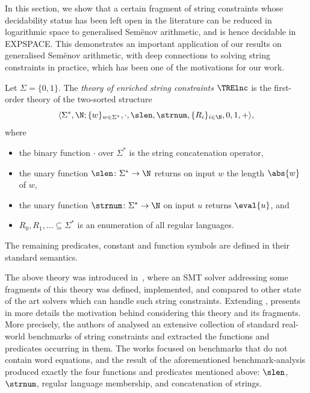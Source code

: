 
In this section, we show that a certain fragment of string constraints
whose decidability status has been left open in the literature can be
reduced in logarithmic space to generalised Sem{\"e}nov arithmetic,
and is hence decidable in EXPSPACE. This demonstrates an important
application of our results on generalised Sem{\"e}nov arithmetic, with
deep connections to solving string constraints in practice, which has
been one of the motivations for our work.

Let $\Sigma = \{ 0,1\}$. The \emph{theory of enriched string
  constraints} $\TRElnc$ is the first-order theory of the two-sorted
structure \[\langle \Sigma^*,\N; \{w\}_{w \in \Sigma^*}, \cdot, \slen,
\strnum, \{R_i \}_{i\in \N}, 0,1,+\rangle,\] where
%
\begin{itemize}
\item the binary function $\cdot$ over $\Sigma^*$ is the string
  concatenation operator,
\item the unary function $\slen\colon \Sigma^* \to \N$ returns on
  input $w$ the length $\abs{w}$ of $w$,
\item the unary function $\strnum\colon \Sigma^* \to \N$ on input $u$
  returns $\eval{u}$, and
\item $R_0,R_1,\ldots \subseteq \Sigma^*$ is an enumeration of all
  regular languages.
\end{itemize}
%
The remaining predicates, constant and function symbols are defined in
their standard semantics.

The above theory was introduced in~\cite{BKMMDNG20}, where an SMT solver addressing some fragments of this theory was defined, implemented, and compared to other state of the art solvers which can handle such string constraints. Extending \cite{BKMMDNG20}, \cite{BDGKMMN23} presents in more details the motivation behind considering this theory and its fragments. More precisely, the authors of \cite{BDGKMMN23} analysed an extensive collection of standard real-world benchmarks of string constraints and extracted the functions and predicates occurring in them. The works \cite{BKMMDNG20,BDGKMMN23} focused on benchmarks that do not contain word equations, and the result of the aforementioned benchmark-analysis produced exactly the four functions and predicates mentioned above: $\slen$, $\strnum$, regular language membership, and concatenation of strings. 

